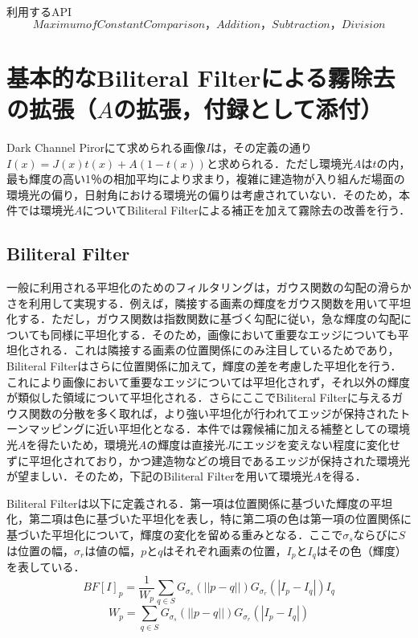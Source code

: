 \documentclass{jsarticle}
\begin{document}
\begin{itembox}[l]{利用するAPI}
\[
Maximum of Constant Comparison， Addition，Subtraction，Division
\]
\end{itembox}


\section{基本的なBiliteral Filterによる霧除去の拡張（$A$の拡張，付録として添付）}
\label{基本的なBiliteral Filterによる霧除去の拡張（$A$の拡張，付録として添付）}

Dark Channel Pirorにて求められる画像$I$は，その定義の通り$I(x)=J(x)t(x)+A(1-t(x))$と求められる．ただし環境光$A$は$t$の内，最も輝度の高い1％の相加平均により求まり，複雑に建造物が入り組んだ場面の環境光の偏り，日射角における環境光の偏りは考慮されていない．そのため，本件では環境光$A$についてBiliteral Filterによる補正を加えて霧除去の改善を行う．

\subsection{Biliteral Filter}
\label{Biliteral Filter}

一般に利用される平坦化のためのフィルタリングは，ガウス関数の勾配の滑らかさを利用して実現する．例えば，隣接する画素の輝度をガウス関数を用いて平坦化する．ただし，ガウス関数は指数関数に基づく勾配に従い，急な輝度の勾配についても同様に平坦化する．そのため，画像において重要なエッジについても平坦化される．これは隣接する画素の位置関係にのみ注目しているためであり，Biliteral Filterはさらに位置関係に加えて，輝度の差を考慮した平坦化を行う．これにより画像において重要なエッジについては平坦化されず，それ以外の輝度が類似した領域について平坦化される．さらにここでBiliteral Filterに与えるガウス関数の分散を多く取れば，より強い平坦化が行われてエッジが保持されたトーンマッピングに近い平坦化となる．本件では霧候補に加える補整としての環境光$A$を得たいため，環境光$A$の輝度は直接光$J$にエッジを変えない程度に変化せずに平坦化されており，かつ建造物などの境目であるエッジが保持された環境光が望ましい．そのため，下記のBiliteral Filterを用いて環境光$A$を得る．

Biliteral Filter\cite{3}は以下に定義される．第一項は位置関係に基づいた輝度の平坦化，第二項は色に基づいた平坦化を表し，特に第二項の色は第一項の位置関係に基づいた平坦化について，輝度の変化を留める重みとなる．ここで$\sigma_s$ならびに$S$は位置の幅，$\sigma_r$は値の幅，$p$と$q$はそれぞれ画素の位置，$I_p$と$I_q$はその色（輝度）を表している．
\[
BF[I]_p = \frac{1}{W_p} \sum_{q \in S} G_{\sigma_s}(||p-q||) G_{\sigma_r}(|I_p-I_q|)I_q
\]
\[
W_p = \sum_{q \in S}G_{\sigma_s}(||p-q||) G_{\sigma_r}(|I_p-I_q|)
\]
\end{document}
